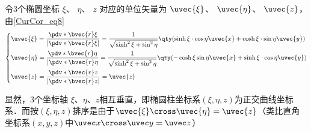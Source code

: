 令3个椭圆坐标 $\xi$、 $\eta$、 $z$ 对应的单位矢量为 $\uvec{\xi}$、 $\uvec{\eta}$、 $\uvec{z}$，由\autoref{CurCor_eq8}~
\begin{equation}
\left\{
    \begin{aligned}
    &\uvec{\xi}=\frac{\pdv*{\bvec{r}}{\xi}}{|\pdv*{\bvec{r}}{\xi}|}=\frac{1}{\sqrt{\sinh^2\xi+\sin^2\eta}}\qty(\sinh\xi\cdot\cos\eta\uvec{x}+\cosh\xi\cdot\sin\eta\uvec{y})\\
    &\uvec{\eta }=\frac{\pdv*{\bvec{r}}{\eta}}{|\pdv*{\bvec{r}}{\eta}}=\frac{1}{\sqrt{\sinh^2\xi+\sin^2\eta}}\qty(-\cosh\xi\sin\eta\uvec{x}+\sinh\xi\cdot\cos\eta\uvec{y})\\
    &\uvec{z}=\frac{\pdv*{\bvec{r}}{z}}{|\pdv*{\bvec{r}}{z}|}=\uvec{z}
    \end{aligned}\right.
\end{equation}

显然，3个坐标轴 $\xi$、$\eta$、$z$相互垂直，即椭圆柱坐标系$(\xi,\eta,z)$为正交曲线坐标系．而按$(\xi,\eta,z)$排序是由于$\uvec{\xi}\cross\uvec{\eta}=\uvec{z}$（类比直角坐标系$(x,y,z)$中$\uvec x\cross\uvec y=\uvec z$）

